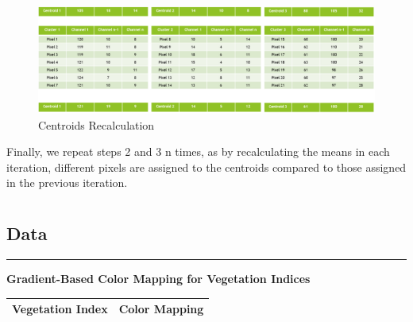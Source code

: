\documentclass{article}
\begin{document}
{                    \newpage
                    \begin{figure}[h]
                        \centering
                        \includegraphics[width=\textwidth]{Figures/pinaxCentrs.png}
                        \caption{Centroids Recalculation}
                        \label{fig:my_label}
                    \end{figure}
                    
                    Finally, we repeat steps 2 and 3 n times, as by recalculating the means in each iteration, different pixels are assigned to the centroids compared to those assigned in the previous iteration.
                    
        \section[Results \& Conclusions]{}
            \setcounter{figure}{0}
                \begin{landscape} %
                    \subsection{Data}\par
                    \vspace*{-3.8\baselineskip}
                    \hrule
                    
                    \thispagestyle{lscape}
                    \pagestyle{lscape}
                    
                    \textbf{Gradient-Based Color Mapping for Vegetation Indices}
                    \vspace*{3\baselineskip}
                    
                    \begin{tabularx}{\linewidth}{>{\arraybackslash}X>{\arraybackslash}X}
                    \toprule
                    \textbf{\hspace{2cm} Vegetation Index} & \hspace{4cm}  \textbf{Color Mapping} \\
                    \midrule
                    

\end{tabularx}
\end{landscape}}
\end{document}
